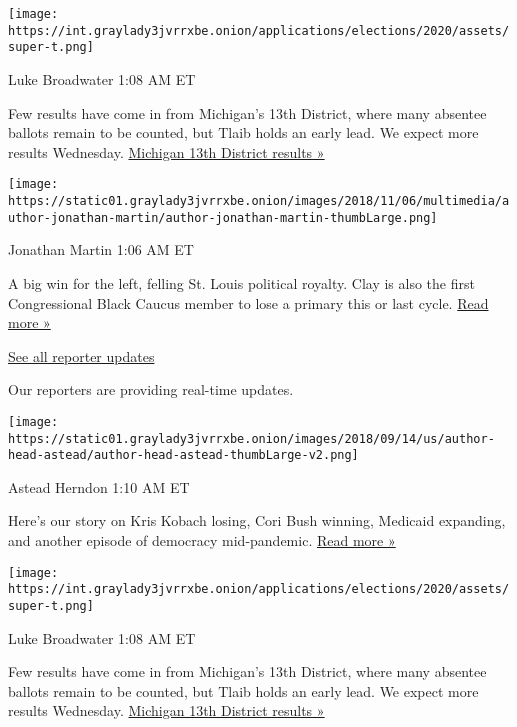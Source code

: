 \texttt{[image: https://int.graylady3jvrrxbe.onion/applications/elections/2020/assets/super-t.png]}

Luke Broadwater 1:08 AM ET

Few results have come in from Michigan's 13th District, where many
absentee ballots remain to be counted, but Tlaib holds an early lead. We
expect more results Wednesday.
\href{https://www.nytimes3xbfgragh.onion/interactive/2020/08/04/us/elections/results-michigan-house-district-13-primary-election.html?action=click\&module=ELEX_results\&pgtype=Interactive\&region=ReporterUpdates}{Michigan
13th District results »}

\texttt{[image: https://static01.graylady3jvrrxbe.onion/images/2018/11/06/multimedia/author-jonathan-martin/author-jonathan-martin-thumbLarge.png]}

Jonathan Martin 1:06 AM ET

A big win for the left, felling St. Louis political royalty. Clay is
also the first Congressional Black Caucus member to lose a primary this
or last cycle.
\href{https://www.nytimes3xbfgragh.onion/2020/08/05/us/politics/cori-bush-missouri-william-lacy-clay.html?action=click\&module=ELEX_results\&pgtype=Interactive\&region=ReporterUpdates}{Read
more »}

\href{https://www.nytimes3xbfgragh.onion/interactive/2020/08/04/us/elections/live-analysis-arizona-kansas-michigan-missouri-primaries.html?action=click\&module=ELEX_results\&pgtype=Interactive\&region=Component}{See
all reporter updates}

Our reporters are providing real-time updates.

\texttt{[image: https://static01.graylady3jvrrxbe.onion/images/2018/09/14/us/author-head-astead/author-head-astead-thumbLarge-v2.png]}

Astead Herndon 1:10 AM ET

Here's our story on Kris Kobach losing, Cori Bush winning, Medicaid
expanding, and another episode of democracy mid-pandemic.
\href{https://www.nytimes3xbfgragh.onion/2020/08/04/us/politics/kobach-tlaib.html?action=click\&module=ELEX_results\&pgtype=Interactive\&region=ReporterUpdates}{Read
more »}

\texttt{[image: https://int.graylady3jvrrxbe.onion/applications/elections/2020/assets/super-t.png]}

Luke Broadwater 1:08 AM ET

Few results have come in from Michigan's 13th District, where many
absentee ballots remain to be counted, but Tlaib holds an early lead. We
expect more results Wednesday.
\href{https://www.nytimes3xbfgragh.onion/interactive/2020/08/04/us/elections/results-michigan-house-district-13-primary-election.html?action=click\&module=ELEX_results\&pgtype=Interactive\&region=ReporterUpdates}{Michigan
13th District results »}

